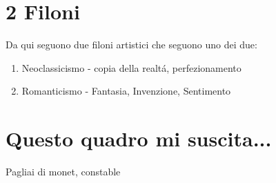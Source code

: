 \documentclass{article}
\begin{document}
\section{2 Filoni}
Da qui seguono due filoni artistici che seguono uno dei due:
\begin{enumerate}
    \item Neoclassicismo - copia della realtá, perfezionamento
    \item Romanticismo - Fantasia, Invenzione, Sentimento
\end{enumerate}
\section{Questo quadro mi suscita...}
Pagliai di monet, constable
\end{document}
